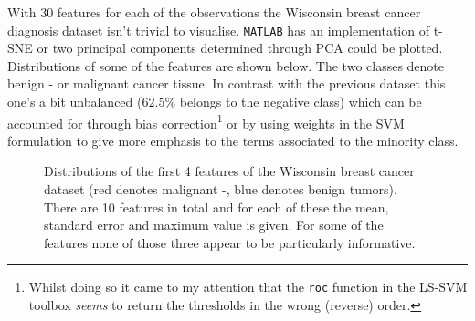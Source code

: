 
With 30 features for each of the observations the Wisconsin breast cancer diagnosis dataset isn't trivial to visualise. \texttt{MATLAB} has an implementation of t-SNE or two principal components determined through PCA could be plotted. Distributions of some of the features are shown below. The two classes denote benign - or malignant cancer tissue. In contrast with the previous dataset this one's a bit unbalanced ($62.5\%$ belongs to the negative class) which can be accounted for through bias correction\footnote{Whilst doing so it came to my attention that the \texttt{roc} function in the LS-SVM toolbox \textit{seems} to return the thresholds in the wrong (reverse) order.} or by using weights in the SVM formulation to give more emphasis to the terms associated to the minority class. 

\vspace{-0.5cm}
\begin{figure}[htp]
\centering
{}\hfil
{}\hfil
{}\hfil
{}\hfil
\caption{Distributions of the first 4 features of the Wisconsin breast cancer dataset (red denotes malignant -, blue denotes benign tumors). There are 10 features in total and for each of these the mean, standard error and maximum value is given. For some of the features none of those three appear to be particularly informative.}
\label{breasthist}
\end{figure}

